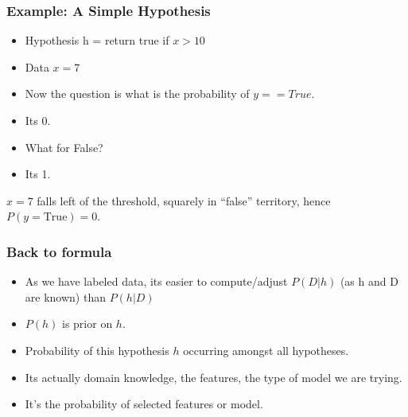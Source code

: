 \begin{frame}[fragile]\frametitle{Example: A Simple Hypothesis}
\begin{itemize}
\item Hypothesis h = return true if $x > 10$
\item Data $x = 7$
\item Now the question is what is the probability of $y == True$.
\item Its 0.
\item What for False?
\item Its 1.
\end{itemize}
\begin{center}

{\small $x=7$ falls left of the threshold, squarely in ``false'' territory, hence $P(y{=}\text{True})=0$.}
\end{center}
\end{frame}

\begin{frame}[fragile]\frametitle{Back to formula}

\begin{itemize}
\item As we have labeled data, its easier to compute/adjust $P(D|h)$ (as h and D are known) than $P(h|D)$
\item $P(h)$ is prior on $h$. 
\item Probability of this hypothesis $h$ occurring amongst all hypotheses. 
\item Its actually domain knowledge, the features, the type of model we are trying. 
\item It’s the probability of selected features or model.
\end{itemize}

\end{frame}



